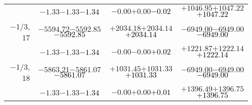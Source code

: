\documentclass[compress]{beamer}
\begin{document}
\begin{frame}
{\begin{tabular}{r | c | c | c}
           & $-1.33$\hspace{0.1 cm}$-1.33$\hspace{0.1 cm}\textcolor{black}{$-1.34$} & $-0.00$\hspace{0.1 cm}$+0.00$\hspace{0.1 cm}\textcolor{black}{$-0.02$} & $+1046.95$\hspace{0.1 cm}$+1047.22$\hspace{0.1 cm}\textcolor{black}{$+1047.22$} \\
$-$1/3, 17 & $-5594.72$\hspace{0.1 cm}$-5592.85$\hspace{0.1 cm}\textcolor{black}{$-5592.85$} & $+2034.18$\hspace{0.1 cm}$+2034.14$\hspace{0.1 cm}\textcolor{black}{$+2034.14$} & $-6949.00$\hspace{0.1 cm}$-6949.00$\hspace{0.1 cm}\textcolor{black}{$-6949.00$} \\
           & $-1.33$\hspace{0.1 cm}$-1.33$\hspace{0.1 cm}\textcolor{black}{$-1.34$} & $-0.00$\hspace{0.1 cm}$-0.00$\hspace{0.1 cm}\textcolor{black}{$+0.02$} & $+1221.87$\hspace{0.1 cm}$+1222.14$\hspace{0.1 cm}\textcolor{black}{$+1222.14$} \\
$-$1/3, 18 & $-5863.21$\hspace{0.1 cm}$-5861.07$\hspace{0.1 cm}\textcolor{black}{$-5861.07$} & $+1031.45$\hspace{0.1 cm}$+1031.33$\hspace{0.1 cm}\textcolor{black}{$+1031.33$} & $-6949.00$\hspace{0.1 cm}$-6949.00$\hspace{0.1 cm}\textcolor{black}{$-6949.00$} \\
           & $-1.33$\hspace{0.1 cm}$-1.33$\hspace{0.1 cm}\textcolor{black}{$-1.34$} & $-0.00$\hspace{0.1 cm}$+0.00$\hspace{0.1 cm}\textcolor{black}{$+0.01$} & $+1396.49$\hspace{0.1 cm}$+1396.75$\hspace{0.1 cm}\textcolor{black}{$+1396.75$} \\
\end{tabular}}
\end{frame}
\end{document}
